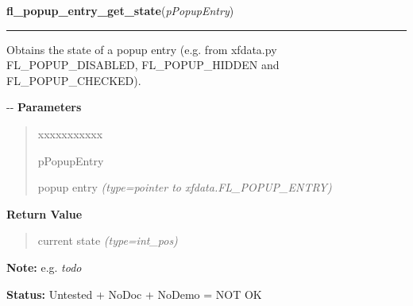     \vspace{0.5ex}

\hspace{.8\funcindent}\begin{boxedminipage}{\funcwidth}

    \raggedright \textbf{fl\_popup\_entry\_get\_state}(\textit{pPopupEntry})

    \vspace{-1.5ex}

    \rule{\textwidth}{0.5\fboxrule}
\setlength{\parskip}{2ex}

Obtains the state of a popup entry (e.g. from xfdata.py
FL\_POPUP\_DISABLED, FL\_POPUP\_HIDDEN and FL\_POPUP\_CHECKED).

-{}-
\setlength{\parskip}{1ex}
      \textbf{Parameters}
      \vspace{-1ex}

      \begin{quote}
        \begin{Ventry}{xxxxxxxxxxx}

          \item[pPopupEntry]


popup entry
            {\it (type=pointer to xfdata.FL\_POPUP\_ENTRY)}

        \end{Ventry}

      \end{quote}

      \textbf{Return Value}
    \vspace{-1ex}

      \begin{quote}

current state
      {\it (type=int\_pos)}

      \end{quote}

\textbf{Note:} 
e.g. \emph{todo}


\textbf{Status:} 
Untested + NoDoc + NoDemo = NOT OK


    \end{boxedminipage}

    \label{xformslib:flpopup:fl_popup_entry_set_state}

    \vspace{0.5ex}

